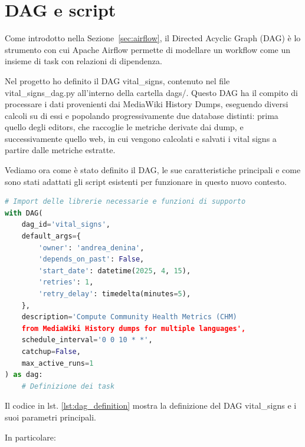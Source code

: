 \section{DAG e script}
\label{sec:dag_script}

Come introdotto nella Sezione~\ref{sec:airflow}, il Directed Acyclic Graph (DAG) è lo strumento con cui Apache Airflow permette di modellare un workflow come un insieme di task con relazioni di dipendenza.

Nel progetto ho definito il DAG vital\_signs, contenuto nel file vital\_signs\_dag.py all’interno della cartella dags/. Questo DAG ha il compito di processare i dati provenienti dai MediaWiki History Dumps, eseguendo diversi calcoli su di essi e popolando progressivamente due database distinti: prima quello degli editors, che raccoglie le metriche derivate dai dump, e successivamente quello web, in cui vengono calcolati e salvati i vital signs a partire dalle metriche estratte.

Vediamo ora come è stato definito il DAG, le sue caratteristiche principali e come sono stati adattati gli script esistenti per funzionare in questo nuovo contesto.


\begin{lstlisting}[language=Python, caption=Definizione del DAG in Airflow, label=lst:dag_definition, basicstyle=\scriptsize\ttfamily]
# Import delle librerie necessarie e funzioni di supporto
with DAG(
    dag_id='vital_signs',
    default_args={
        'owner': 'andrea_denina',
        'depends_on_past': False,
        'start_date': datetime(2025, 4, 15),
        'retries': 1,
        'retry_delay': timedelta(minutes=5),
    },
    description='Compute Community Health Metrics (CHM) 
    from MediaWiki History dumps for multiple languages',
    schedule_interval='0 0 10 * *',
    catchup=False,
    max_active_runs=1
) as dag:
    # Definizione dei task
\end{lstlisting}

Il codice in lst. \ref{lst:dag_definition} mostra la definizione del DAG vital\_signs e i suoi parametri principali.

In particolare:

